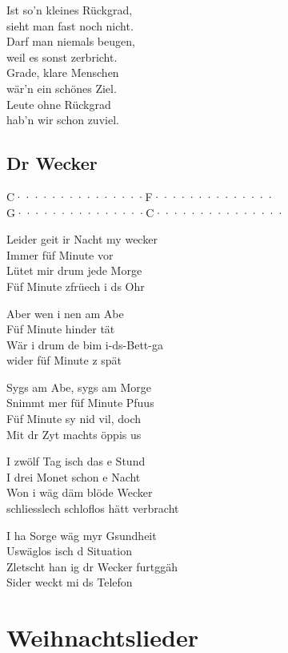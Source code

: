 \documentclass[
  letterpaper,
  twoside=false]{scrbook}
\begin{document}
Ist so'n kleines Rückgrad,\\
sieht man fast noch nicht.\\
Darf man niemals beugen,\\
weil es sonst zerbricht.\\
Grade, klare Menschen\\
wär'n ein schönes Ziel.\\
Leute ohne Rückgrad\\
hab'n wir schon zuviel.

\hypertarget{dr-wecker}{%
\chapter{Dr Wecker}\label{dr-wecker}}

\textbar C·······\textbar········\textbar F······\textbar········\textbar{}\\
\textbar G·······\textbar········\textbar C·······\textbar········\textbar{}

Leider geit ir Nacht my wecker\\
Immer füf Minute vor\\
Lütet mir drum jede Morge\\
Füf Minute z\textquotesingle früech i ds Ohr

Aber wen i nen am Abe\\
Füf Minute hinder tät\\
Wär i drum de bim i-ds-Bett-ga\\
wider füf Minute z spät

Syg\textquotesingle s am Abe, syg\textquotesingle s am Morge\\
S\textquotesingle nimmt mer füf Minute Pfuus\\
Füf Minute sy nid vil, doch\\
Mit dr Zyt macht\textquotesingle s öppis us

I zwölf Tag isch das e Stund\\
I drei Monet schon e Nacht\\
Won i wäg däm blöde Wecker\\
schliesslech schloflos hätt verbracht

I ha Sorge wäg myr Gsundheit\\
Uswäglos isch d Situation\\
Zletscht han ig dr Wecker furtggäh\\
Sider weckt mi ds Telefon

\part{Weihnachtslieder}
\end{document}
